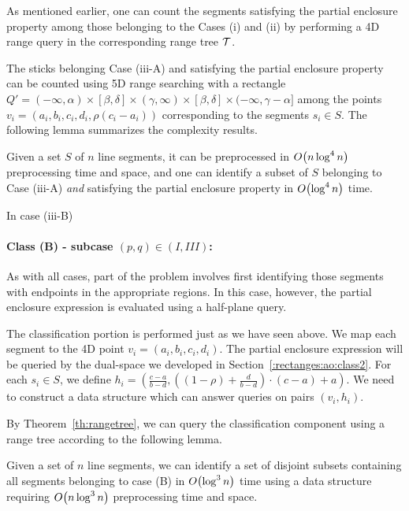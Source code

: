 As mentioned earlier, one can count the segments satisfying the
partial enclosure property among those belonging to the Cases (i) 
and (ii) by performing a 4D range query in the corresponding 
range tree $\cal T$. 

The sticks belonging Case (iii-A) and satisfying the partial enclosure 
property can be counted using 5D range searching with a rectangle $Q'=
(-\infty, \alpha) \times [\beta, \delta] \times (\gamma, \infty) 
\times [\beta, \delta] \times (-\infty, \gamma - \alpha]$ among the 
points $v_i = (a_i, b_i, c_i, d_i, \rho(c_i - a_i))$ corresponding 
to the segments $s_i \in S$. The following lemma summarizes 
the complexity results. 

\begin{lemma}
\label{lem:ao:class1:v}
Given a set $S$ of $n$ line segments, it can be preprocessed 
in $O\!\left(n\log^4{n}\right)$ preprocessing time and space, and one
can identify a subset of $S$ belonging to Case (iii-A) \emph{and} 
satisfying the partial enclosure property in $O\!\left(\log^4{n}\right)$ 
time.  
\end{lemma}

In case (iii-B)
\paragraph{Class (B) - subcase $(p, q) \in (I, III)$:} 
As with all cases, part of the problem involves first identifying those segments with endpoints in the appropriate regions.
In this case, however, the partial enclosure expression is evaluated using a half-plane query.

The classification portion is performed just as we have seen above. We map each segment to the 4D point $v_i = ( a_i, b_i, c_i, d_i )$.
The partial enclosure expression will be queried by the dual-space we developed in Section~\ref{:rectanges:ao:class2}. 
For each $s_i \in S$, we define $h_i = \left ( \frac{c - a}{b - d}, \left ( (1 - \rho) + \frac{d}{b-d} \right ) \cdot (c-a) + a \right )$.
We need to construct a data structure which can answer queries on pairs $(v_i, h_i)$.

By Theorem~\ref{th:rangetree}, we can query the classification component using a range tree according to the following lemma.
\begin{lemma}
\label{lem:ao:class2:v}
Given a set of $n$ line segments, we can identify a set of disjoint subsets containing all segments belonging to case (B) in $O\!\left(\log^3{n}\right)$ time using a data structure requiring $O\!\left(n\log^3{n}\right)$ preprocessing time and space.
\end{lemma}

